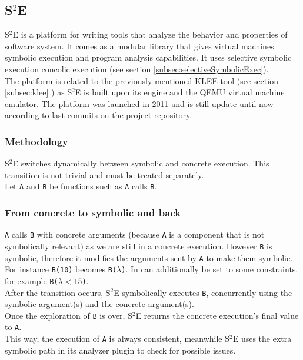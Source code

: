 \documentclass[11pt, conference]{IEEEtran}
\begin{document}
	\subsection{S$^2$E}
    \label{subsec:S2E}
    	S$^2$E is a platform for writing tools that analyze the behavior and properties of software system. It comes as a modular library that gives virtual machines symbolic execution and program analysis capabilities.\cite{S2EWebSite} It uses selective symbolic execution concolic execution (see section  \ref{subsec:selectiveSymbolicExec}).\\

		The platform is related to the previously mentioned KLEE tool (see section \ref{subsec:klee} ) as S$^2$E is built upon its engine and the QEMU virtual machine emulator.
    	The platform was launched in 2011 and is still update until now according to last commits on the \href{https://github.com/S2E}{project repository}.

    	\subsubsection{Methodology}
    		S$^2$E switches dynamically between symbolic and concrete execution. This transition is not trivial and must be treated separately.\\
    		Let \texttt{A} and \texttt{B} be functions such as \texttt{A} calls \texttt{B}.\\
    		\subsubsection*{From concrete to symbolic and back}
    			\texttt{A} calls \texttt{B} with concrete arguments (because \texttt{A} is a component that is not symbolically relevant) as we are still in a concrete execution. However \texttt{B} is symbolic, therefore it modifies the arguments sent by \texttt{A} to make them symbolic. For instance \texttt{B(10)} becomes \texttt{B($\lambda$)}. In can additionally be set to some constraints, for example \texttt{B($\lambda < 15$)}.\\
    			After the transition occurs, S$^2$E symbolically executes \texttt{B}, concurrently using the symbolic argument(s) and the concrete argument(s).\\
    			Once the exploration of \texttt{B} is over, S$^2$E returns the concrete execution's final value to \texttt{A}.\\
    			This way, the execution of \texttt{A} is always consistent, meanwhile S$^2$E uses the extra symbolic path in its analyzer plugin to check for possible issues.
\end{document}

